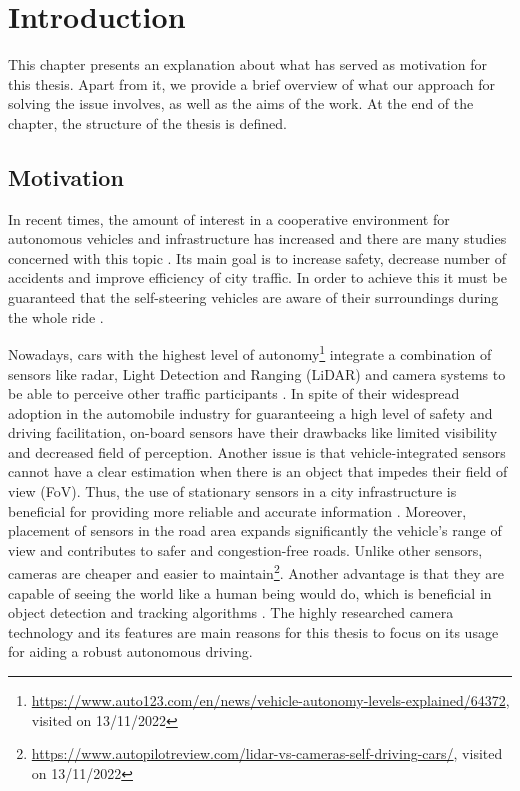 \chapter{Introduction}
\label{introduction}
This chapter presents an explanation about what has served as motivation for this thesis. Apart from it, we provide a brief overview of what our approach for solving the issue involves, as well as the aims of the work. At the end of the chapter, the structure of the thesis is defined.

\section{Motivation}
In recent times, the amount of interest in a cooperative environment for autonomous vehicles and infrastructure has increased and there are many studies concerned with this topic \cite{cvis_article_one, cvis_article_two}. Its main goal is to increase safety, decrease number of accidents and improve efficiency of city traffic. In order to achieve this it must be guaranteed that the self-steering vehicles are aware of their surroundings during the whole ride \cite{onboard_sensors}.

Nowadays, cars with the highest level of autonomy\footnote{\url{https://www.auto123.com/en/news/vehicle-autonomy-levels-explained/64372}, visited on 13/11/2022} integrate a combination of sensors like radar, Light Detection and Ranging (LiDAR) and camera systems to be able to perceive other traffic participants \cite{autonomous_cars_sensors}. In spite of their widespread adoption in the automobile industry for guaranteeing a high level of safety and driving facilitation, on-board sensors have their drawbacks like limited visibility and decreased field of perception. Another issue is that vehicle-integrated sensors cannot have a clear estimation when there is an object that impedes their field of view (FoV). Thus, the use of stationary sensors in a city infrastructure is beneficial for providing more reliable and accurate information \cite{roadside_lidar}. Moreover, placement of sensors in the road area expands significantly the vehicle's range of view and contributes to safer and congestion-free roads. Unlike other sensors, cameras are cheaper and easier to maintain\footnote{\url{https://www.autopilotreview.com/lidar-vs-cameras-self-driving-cars/}, visited on 13/11/2022}. Another advantage is that they are capable of seeing the world like a human being would do, which is beneficial in object detection and tracking algorithms \cite{camera_object_detection}. The highly researched camera technology and its features are main reasons for this thesis to focus on its usage for aiding a robust autonomous driving.

